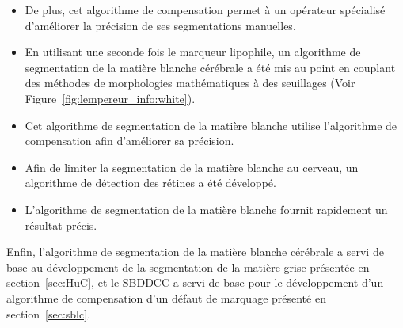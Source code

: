 \documentclass[\main/main.tex]{subfiles}
\begin{document}
\begin{itemize}
    \item
    De plus, cet algorithme de compensation permet à un opérateur spécialisé
    d'améliorer la précision de ses segmentations manuelles.
    
    \item
    En utilisant une seconde fois le marqueur lipophile, un algorithme de segmentation de la matière blanche cérébrale a été mis au point en couplant des méthodes de morphologies mathématiques à des seuillages (Voir Figure~\ref{fig:lempereur_info:white}).
    
    \item
    Cet algorithme de segmentation de la matière blanche utilise
    l'algorithme de compensation afin d'améliorer sa précision.
    
    \item
    Afin de limiter la segmentation de la matière blanche au cerveau,
    un algorithme de détection des rétines a été développé.
    
    \item
    L'algorithme de segmentation de la matière blanche fournit rapidement un résultat précis. 
    
\end{itemize}

%
Enfin, l'algorithme de segmentation de la matière blanche cérébrale a servi de base au
développement de la segmentation de la matière grise présentée en section~\ref{sec:HuC},
et le SBDDCC a servi de base pour le développement d'un algorithme de compensation
d'un défaut de marquage \ihc{} présenté en section~\ref{sec:sblc}.
\end{document}
